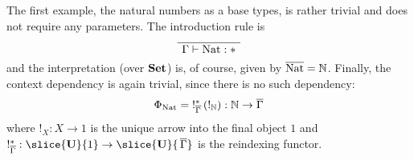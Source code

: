 \documentclass[runningheads,envcountsame,envcountsect,orivec]{llncs}
\begin{document}
\begin{example}
  The first example, the natural numbers as a base types, is rather trivial and
  does not require any parameters.
  The introduction rule is
  \begin{equation*}
    \AxiomC{}
    \UnaryInfC{$\Gamma \vdash \NatT : \ast$}
    \DisplayProof
  \end{equation*}
  and the interpretation (over $\mathbf{Set}$) is, of course, given by
  $\overline{\operatorname{Nat}} = \mathbb{N}$.
  Finally, the context dependency is again trivial, since there is no such
  dependency:
  \begin{equation*}
    \Phi_{\operatorname{Nat}} = \; !_{\overline{\Gamma}}^\ast \, ( !_{\mathbb{N}})
      : \mathbb{N} \to \overline{\Gamma}
  \end{equation*}
  where $!_X : X \to 1$ is the unique arrow into the final object $1$ and
  $!_{\overline{\Gamma}}^\ast :
  \slice{\Cat{U}}{1} \to \slice{\Cat{U}}{\, \overline{\Gamma}}$
  is the reindexing functor.
\end{example}
\end{document}
